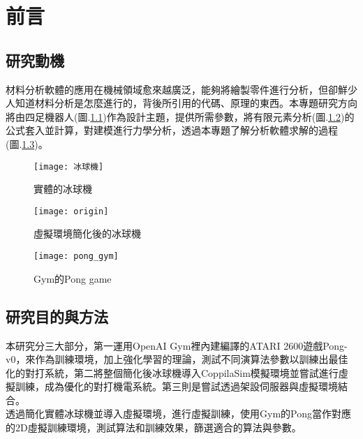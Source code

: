 \chapter{前言}
\renewcommand{\baselinestretch}{10.0} %
\setcounter{page}{1}  %
\fontsize{14pt}{2.5pt}\sectionef
\section{研究動機}
材料分析軟體的應用在機械領域愈來越廣泛，能夠將繪製零件進行分析，但卻鮮少人知道材料分析是怎麼進行的，背後所引用的代碼、原理的東西。本專題研究方向將由四足機器人(圖.\ref{fig.冰球機})作為設計主題，提供所需參數，將有限元素分析(圖.\ref{fig.模擬冰球機})的公式套入並計算，對建模進行力學分析，透過本專題了解分析軟體求解的過程(圖.\ref{fig.pong_gym})。\\

\begin{figure}[hbt!]
\begin{center}
\texttt{[image: 冰球機]}
\caption{\Large 實體的冰球機}\label{fig.冰球機}
\end{center}
\end{figure}
\begin{figure}[hbt!]
\begin{center}
\texttt{[image: origin]}
\caption{\Large 虛擬環境簡化後的冰球機}\label{fig.模擬冰球機}
\end{center}
\end{figure}
\begin{figure}[hbt!]
\begin{center}
\texttt{[image: pong\_gym]}
\caption{\Large Gym的Pong game}\label{fig.pong_gym}
\end{center}
\end{figure}


\section{研究目的與方法}
本研究分三大部分，第一運用OpenAI Gym裡內建編譯的ATARI 2600遊戲Pong-v0，來作為訓練環境，加上強化學習的理論，測試不同演算法參數以訓練出最佳化的對打系統，第二將整個簡化後冰球機導入CoppilaSim模擬環境並嘗試進行虛擬訓練，成為優化的對打機電系統。第三則是嘗試透過架設伺服器與虛擬環境結合。\\
 
透過簡化實體冰球機並導入虛擬環境，進行虛擬訓練，使用Gym的Pong當作對應的2D虛擬訓練環境，測試算法和訓練效果，篩選適合的算法與參數。\\

